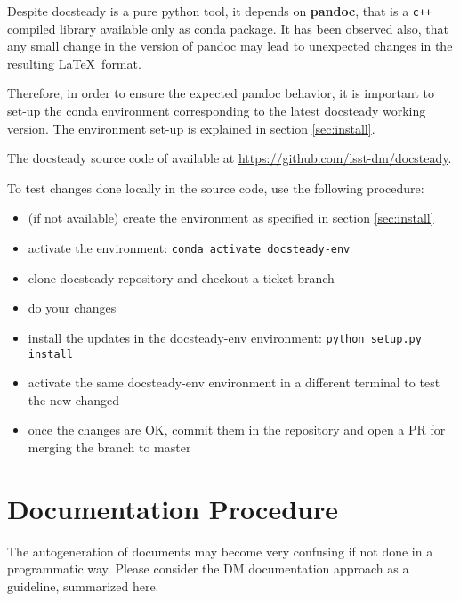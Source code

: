 \documentclass[DM]{lsstdoc}
\begin{document}
Despite docsteady is a pure python tool, it depends on \textbf{pandoc}, that is a \texttt{c++} compiled library available only as conda package.
It has been observed also, that any small change in the version of pandoc may lead to unexpected changes in the resulting \LaTeX~format.

Therefore, in order to ensure the expected pandoc behavior, it is important to set-up the conda environment corresponding to the latest docsteady working version.
The environment set-up is explained in section \ref{sec:install}.

The docsteady source code of available at \url{https://github.com/lsst-dm/docsteady}.

To test changes done locally in the source code, use the following procedure:

\begin{itemize}
\item (if not available) create the environment as specified in section \ref{sec:install}
\item activate the environment: \texttt{conda activate docsteady-env}
\item clone docsteady repository and checkout a ticket branch
\item do your changes
\item install the updates in the docsteady-env environment: \texttt{python setup.py install}
\item activate the same docsteady-env environment in a different terminal to test the new changed
\item once the changes are OK, commit them in the repository and open a PR for merging the branch to master
\end{itemize}



\section{Documentation Procedure}
\label{sec:docproc}

The autogeneration of documents may become very confusing if not done in a programmatic way.
Please consider the DM documentation approach as a guideline, summarized here.
\end{document}
